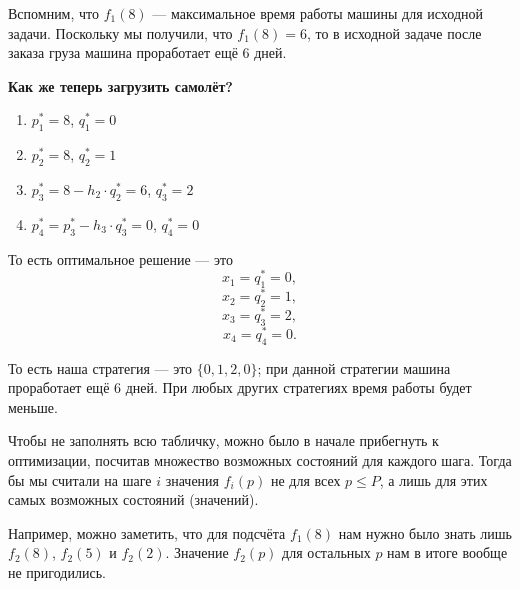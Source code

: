 \begin{enumerate}
	Вспомним, что $f_1(8)$ --- максимальное время работы машины для исходной задачи. Поскольку мы получили, что $f_1(8) = 6$, то в исходной задаче после заказа груза машина проработает ещё 6 дней.
	
	\textbf{Как же теперь загрузить самолёт?}
	
	\begin{enumerate}
		\item $p_1^* = 8$, $q_1^* = 0$
		
		\item $p_2^* = 8$, $q_2^* = 1$
		
		\item $p_3^* = 8 - h_2 \cdot q_2^* = 6$, $q_3^* = 2$
		
		\item $p_4^* = p_3^* - h_3 \cdot q_3^* = 0$, $q_4^* = 0$
	\end{enumerate}
	
	То есть оптимальное решение --- это
	\[
		x_1 = q_1^* = 0,
	\]
	\[
		x_2 = q_2^* = 1,
	\]
	\[
		x_3 = q_3^* = 2,
	\]
	\[
		x_4 = q_4^* = 0.
	\]
	
	То есть наша стратегия --- это $\{0, 1, 2, 0\}$; при данной стратегии машина проработает ещё 6 дней. При любых других стратегиях время работы будет меньше.
\end{enumerate}

\remark

Чтобы не заполнять всю табличку, можно было в начале прибегнуть к оптимизации, посчитав множество возможных состояний для каждого шага. Тогда бы мы считали на шаге $i$ значения $f_i(p)$ не для всех $p \le P$, а лишь для этих самых возможных состояний (значений).

Например, можно заметить, что для подсчёта $f_1(8)$ нам нужно было знать лишь $f_2(8)$, $f_2(5)$ и $f_2(2)$. Значение $f_2(p)$ для остальных $p$ нам в итоге вообще не пригодились.

